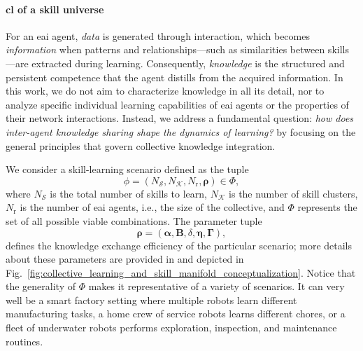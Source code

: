 \documentclass[12pt]{article}
\renewcommand{\emph}[1]{\textit{#1}}
\begin{document}

\paragraph*{\Acl{cl} of a skill universe}
For an \ac{eai} agent, \emph{data} is generated through interaction, which becomes \emph{information} when patterns and relationships---such as similarities between skills---are extracted during learning. Consequently, \emph{knowledge} is the structured and persistent competence that the agent distills from the acquired information. In this work, we do not aim to characterize knowledge in all its detail, nor to analyze specific individual learning capabilities of \ac{eai} agents or the properties of their network interactions. Instead, we address a fundamental question: \emph{how does inter-agent knowledge sharing shape the dynamics of learning?} by focusing on the general principles that govern collective knowledge integration.

We consider a skill-learning scenario defined as the tuple
\begin{equation*}
	\phi = \left(N_\mathcal{S}, N_\mathcal{K}, N_\mathrm{r}, \bm{\rho} \right) \in \Phi,
\end{equation*}
where $N_\mathcal{S}$ is the total number of skills to learn, $N_\mathcal{K}$ is the number of skill clusters, $N_\mathrm{r}$ is the number of \ac{eai} agents, i.e., the size of the collective, and $\Phi$ represents the set of all possible viable combinations. The parameter tuple
\begin{equation*}
	\bm{\rho} = \left(\bm{\alpha}, \bm{B}, \delta, \bm{\eta},\bm{\Gamma}\right),
\end{equation*}
defines the knowledge exchange efficiency of the particular scenario; more details about these parameters are provided in  and depicted in Fig.~\ref{fig:collective_learning_and_skill_manifold_conceptualization}. Notice that the generality of $\Phi$ makes it representative of a variety of scenarios. It can very well be a smart factory setting where multiple robots learn different manufacturing tasks, a home crew of service robots learns different chores, or a fleet of underwater robots performs exploration, inspection, and maintenance routines.
\end{document}
